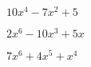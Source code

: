 \documentclass{article}
\begin{document}
\begin{multicols}{2}
 $10x^{4}-7x^2+5$\item $2x^{6}-10x^{3}+5x$\item $7x^{6}+4x^{5}+x^{4}$\item 
\end{multicols}
\end{document}
